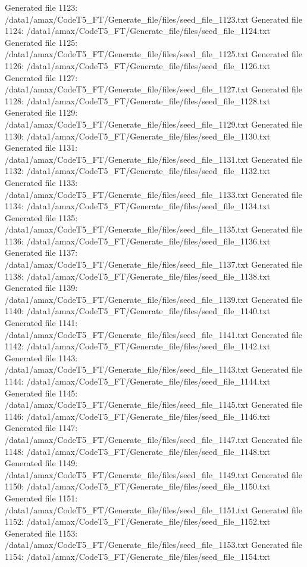 Generated file 1123: /data1/amax/CodeT5_FT/Generate_file/files/seed_file_1123.txt
Generated file 1124: /data1/amax/CodeT5_FT/Generate_file/files/seed_file_1124.txt
Generated file 1125: /data1/amax/CodeT5_FT/Generate_file/files/seed_file_1125.txt
Generated file 1126: /data1/amax/CodeT5_FT/Generate_file/files/seed_file_1126.txt
Generated file 1127: /data1/amax/CodeT5_FT/Generate_file/files/seed_file_1127.txt
Generated file 1128: /data1/amax/CodeT5_FT/Generate_file/files/seed_file_1128.txt
Generated file 1129: /data1/amax/CodeT5_FT/Generate_file/files/seed_file_1129.txt
Generated file 1130: /data1/amax/CodeT5_FT/Generate_file/files/seed_file_1130.txt
Generated file 1131: /data1/amax/CodeT5_FT/Generate_file/files/seed_file_1131.txt
Generated file 1132: /data1/amax/CodeT5_FT/Generate_file/files/seed_file_1132.txt
Generated file 1133: /data1/amax/CodeT5_FT/Generate_file/files/seed_file_1133.txt
Generated file 1134: /data1/amax/CodeT5_FT/Generate_file/files/seed_file_1134.txt
Generated file 1135: /data1/amax/CodeT5_FT/Generate_file/files/seed_file_1135.txt
Generated file 1136: /data1/amax/CodeT5_FT/Generate_file/files/seed_file_1136.txt
Generated file 1137: /data1/amax/CodeT5_FT/Generate_file/files/seed_file_1137.txt
Generated file 1138: /data1/amax/CodeT5_FT/Generate_file/files/seed_file_1138.txt
Generated file 1139: /data1/amax/CodeT5_FT/Generate_file/files/seed_file_1139.txt
Generated file 1140: /data1/amax/CodeT5_FT/Generate_file/files/seed_file_1140.txt
Generated file 1141: /data1/amax/CodeT5_FT/Generate_file/files/seed_file_1141.txt
Generated file 1142: /data1/amax/CodeT5_FT/Generate_file/files/seed_file_1142.txt
Generated file 1143: /data1/amax/CodeT5_FT/Generate_file/files/seed_file_1143.txt
Generated file 1144: /data1/amax/CodeT5_FT/Generate_file/files/seed_file_1144.txt
Generated file 1145: /data1/amax/CodeT5_FT/Generate_file/files/seed_file_1145.txt
Generated file 1146: /data1/amax/CodeT5_FT/Generate_file/files/seed_file_1146.txt
Generated file 1147: /data1/amax/CodeT5_FT/Generate_file/files/seed_file_1147.txt
Generated file 1148: /data1/amax/CodeT5_FT/Generate_file/files/seed_file_1148.txt
Generated file 1149: /data1/amax/CodeT5_FT/Generate_file/files/seed_file_1149.txt
Generated file 1150: /data1/amax/CodeT5_FT/Generate_file/files/seed_file_1150.txt
Generated file 1151: /data1/amax/CodeT5_FT/Generate_file/files/seed_file_1151.txt
Generated file 1152: /data1/amax/CodeT5_FT/Generate_file/files/seed_file_1152.txt
Generated file 1153: /data1/amax/CodeT5_FT/Generate_file/files/seed_file_1153.txt
Generated file 1154: /data1/amax/CodeT5_FT/Generate_file/files/seed_file_1154.txt
